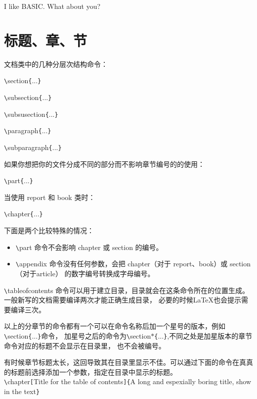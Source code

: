 \documentclass[UTF8]{ctexart}
\begin{document}
I like BASIC\@. What about you?
\section{标题、章、节}
文档类中的几种分层次结构命令：

\texttt{\textbackslash}section\texttt{\{}...\texttt{\}}

\texttt{\textbackslash}subsection\texttt{\{}...\texttt{\}}

\texttt{\textbackslash}subsusection\texttt{\{}...\texttt{\}}

\texttt{\textbackslash}paragraph\texttt{\{}...\texttt{\}}

\texttt{\textbackslash}subparagraph\texttt{\{}...\texttt{\}}

如果你想把你的文件分成不同的部分而不影响章节编号的的使用：

\texttt{\textbackslash}part\texttt{\{}...\texttt{\}}

当使用 report 和 book 类时：

\texttt{\textbackslash}chapter\texttt{\{}...\texttt{\}}

下面是两个比较特殊的情况：
\begin{itemize}
  \item \texttt{\textbackslash}part 命令不会影响 chapter 或 section 的编号。
  \item \texttt{\textbackslash}appendix 命令没有任何参数，会把 chapter（对于 report、book）或 section（对于article）
  的数字编号转换成字母编号。
\end{itemize}

\texttt{\textbackslash}tableofcontents 命令可以用于建立目录，目录就会在这条命令所在的位置生成。一般新写的文档需要编译两次才能正确生成目录，
必要的时候\LaTeX 也会提示需要编译三次。

以上的分章节的命令都有一个可以在命令名称后加一个星号的版本，例如\texttt{\textbackslash}section\texttt{\{}...\texttt{\}}命令，
加星号之后的命令为\texttt{\textbackslash}section\texttt{$*$}\texttt{\{}...\texttt{\}},不同之处是加星版本的章节命令对应的标题不会显示在目录里，
也不会被编号。

有时候章节标题太长，这回导致其在目录里显示不佳。可以通过下面的命令在真真的标题前选择添加一个参数，指定在目录中显示的标题。
\\

\texttt{\textbackslash}chapter\texttt{[}Title for the table of contents\texttt{]}\texttt{\{}A long and espexially boring title, show
in the text\texttt{\}}
\\
\end{document}
